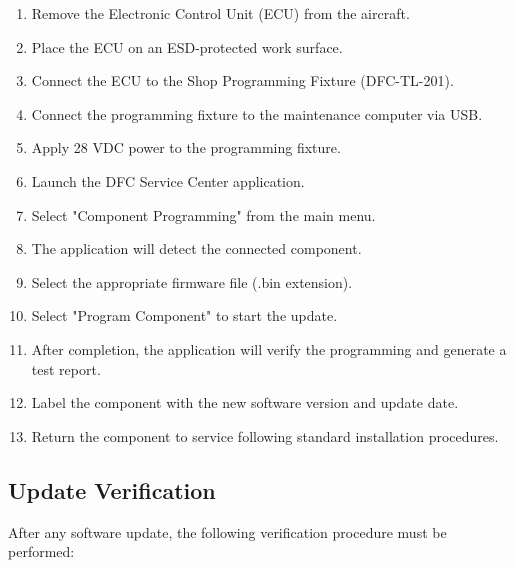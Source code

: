 \documentclass[12pt,a4paper,twoside,openright]{book}
\begin{document}
\begin{enumerate}
    \item Remove the Electronic Control Unit (ECU) from the aircraft.
    \item Place the ECU on an ESD-protected work surface.
    \item Connect the ECU to the Shop Programming Fixture (DFC-TL-201).
    \item Connect the programming fixture to the maintenance computer via USB.
    \item Apply 28 VDC power to the programming fixture.
    \item Launch the DFC Service Center application.
    \item Select "Component Programming" from the main menu.
    \item The application will detect the connected component.
    \item Select the appropriate firmware file (.bin extension).
    \item Select "Program Component" to start the update.
    \item After completion, the application will verify the programming and generate a test report.
    \item Label the component with the new software version and update date.
    \item Return the component to service following standard installation procedures.
\end{enumerate}

\subsection{Update Verification}

After any software update, the following verification procedure must be performed:
\end{document}
